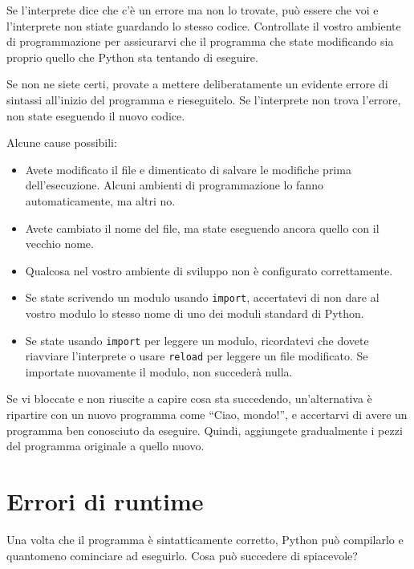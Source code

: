 \documentclass[10pt]{book}
\begin{document}
Se l'interprete dice che c'è un errore ma non lo trovate, può essere che voi e l'interprete non stiate guardando lo stesso codice. Controllate il vostro ambiente di programmazione per assicurarvi che il programma che state modificando sia proprio quello che Python sta tentando di eseguire.

Se non ne siete certi, provate a mettere deliberatamente un evidente errore di sintassi all'inizio del programma e rieseguitelo. Se l'interprete non trova l'errore, non state eseguendo il nuovo codice.

Alcune cause possibili:

\begin{itemize}

\item Avete modificato il file e dimenticato di salvare le modifiche prima dell'esecuzione. Alcuni ambienti di programmazione lo fanno automaticamente, ma altri no.

\item Avete cambiato il nome del file, ma state eseguendo ancora quello con il vecchio nome.

\item Qualcosa nel vostro ambiente di sviluppo non è configurato correttamente.

\item Se state scrivendo un modulo usando {\tt import}, accertatevi di non dare al vostro modulo lo stesso nome di uno dei moduli standard di Python.

\item Se state usando {\tt import} per leggere un modulo, ricordatevi che dovete riavviare l'interprete o usare {\tt reload} per leggere un file modificato. Se importate nuovamente il modulo, non succederà nulla.

\end{itemize}

Se vi bloccate e non riuscite a capire cosa sta succedendo, un'alternativa è ripartire con un nuovo programma come ``Ciao, mondo!'', e accertarvi di avere un programma ben conosciuto da eseguire. Quindi, aggiungete gradualmente i pezzi del programma originale a quello nuovo.


\section{Errori di runtime}

Una volta che il programma è sintatticamente corretto, Python può compilarlo e quantomeno cominciare ad eseguirlo. Cosa può succedere di spiacevole?
\end{document}
